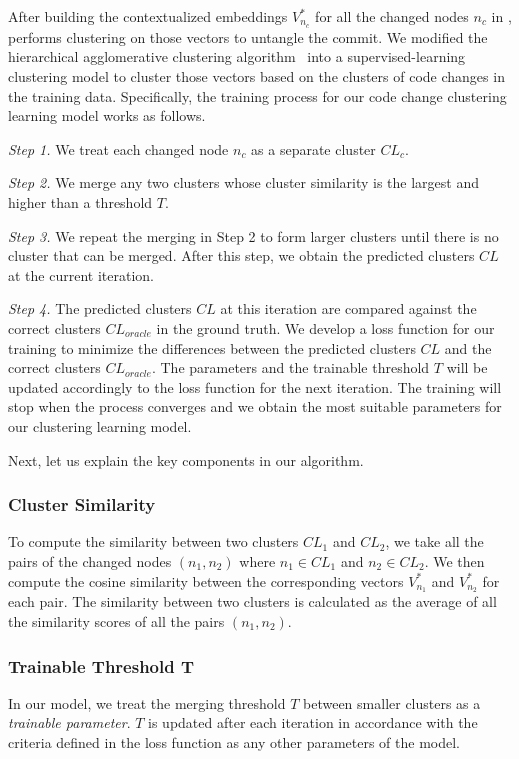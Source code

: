 After building the contextualized embeddings $V^{*}_{n_c}$ for all the
changed nodes $n_c$ in {\mvpdg}, {\tool} performs clustering on those
vectors to untangle the commit. We modified the hierarchical
agglomerative clustering algorithm~\cite{clustering} into a
supervised-learning clustering model to cluster those vectors based on
the clusters of code changes in the training data. Specifically, the
training process for our code change clustering learning model works as
follows.

{\em Step 1.} We treat each changed node $n_c$ as
a separate cluster $CL_c$.

{\em Step 2.} We merge any two clusters whose cluster
similarity is the largest and higher than a threshold $T$.

{\em Step 3.} We repeat the merging in Step 2 to form
larger clusters until there is no cluster that can be merged. After
this step, we obtain the predicted clusters $CL$ at the current
iteration.

{\em Step 4.} The predicted clusters $CL$ at this iteration
are compared against the correct clusters $CL_{oracle}$ in the ground
truth. We develop a loss function for our training to minimize the
differences between the predicted clusters $CL$ and the correct
clusters $CL_{oracle}$. The parameters and the trainable threshold $T$
will be updated accordingly to the loss function for the next
iteration. The training will stop when the process converges and we
obtain the most suitable parameters for our clustering learning model.

Next, let us explain the key components in our algorithm.

\subsubsection{Cluster Similarity}
To compute the similarity between two clusters $CL_1$ and $CL_2$, we
take all the pairs of the changed nodes $(n_1,n_2)$ where $n_1 \in
CL_1$ and $n_2 \in CL_2$. We then compute the cosine similarity
between the corresponding vectors $V^{*}_{n_1}$ and $V^{*}_{n_2}$ for
each pair. The similarity between two clusters is calculated as the
average of all the similarity scores of all the pairs $(n_1,n_2)$.

\subsubsection{Trainable Threshold T}
In our
model, we treat the merging threshold $T$ between smaller clusters as
a {\em trainable parameter}. $T$ is updated after each iteration in
accordance with the criteria defined in the loss function as any other
parameters of the model.

